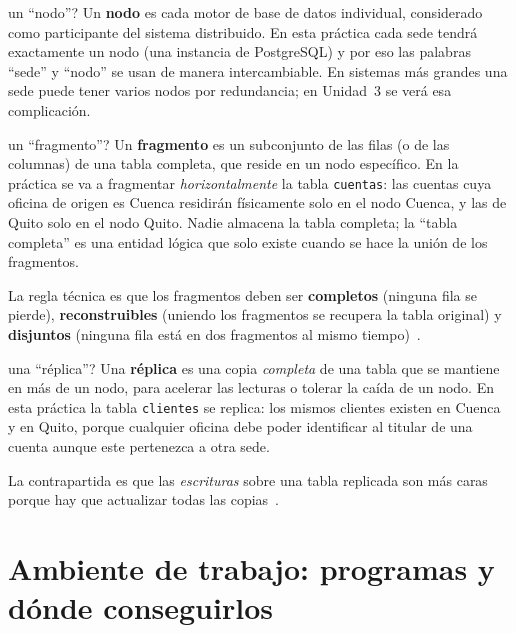 \documentclass[11pt,a4paper]{article}
\begin{document}
\begin{conceptobox}{un ``nodo''?}
Un \textbf{nodo} es cada motor de base de datos individual, considerado como participante del sistema distribuido. En esta pr\'actica cada sede tendr\'a exactamente un nodo (una instancia de PostgreSQL) y por eso las palabras ``sede'' y ``nodo'' se usan de manera intercambiable. En sistemas m\'as grandes una sede puede tener varios nodos por redundancia; en Unidad~3 se ver\'a esa complicaci\'on.
\end{conceptobox}

\begin{conceptobox}{un ``fragmento''?}
Un \textbf{fragmento} es un subconjunto de las filas (o de las columnas) de una tabla completa, que reside en un nodo espec\'ifico. En la pr\'actica se va a fragmentar \emph{horizontalmente} la tabla \texttt{cuentas}: las cuentas cuya oficina de origen es Cuenca residir\'an f\'isicamente solo en el nodo Cuenca, y las de Quito solo en el nodo Quito. Nadie almacena la tabla completa; la ``tabla completa'' es una entidad l\'ogica que solo existe cuando se hace la uni\'on de los fragmentos.

La regla t\'ecnica es que los fragmentos deben ser \textbf{completos} (ninguna fila se pierde), \textbf{reconstruibles} (uniendo los fragmentos se recupera la tabla original) y \textbf{disjuntos} (ninguna fila est\'a en dos fragmentos al mismo tiempo)~\cite[cap.~3]{Ozsu2020Principles}.
\end{conceptobox}

\begin{conceptobox}{una ``r\'eplica''?}
Una \textbf{r\'eplica} es una copia \emph{completa} de una tabla que se mantiene en m\'as de un nodo, para acelerar las lecturas o tolerar la ca\'ida de un nodo. En esta pr\'actica la tabla \texttt{clientes} se replica: los mismos clientes existen en Cuenca y en Quito, porque cualquier oficina debe poder identificar al titular de una cuenta aunque este pertenezca a otra sede.

La contrapartida es que las \emph{escrituras} sobre una tabla replicada son m\'as caras porque hay que actualizar todas las copias~\cite{Kleppmann2017DDIA}.
\end{conceptobox}

\clearpage
\section{Ambiente de trabajo: programas y d\'onde conseguirlos}
\end{document}
